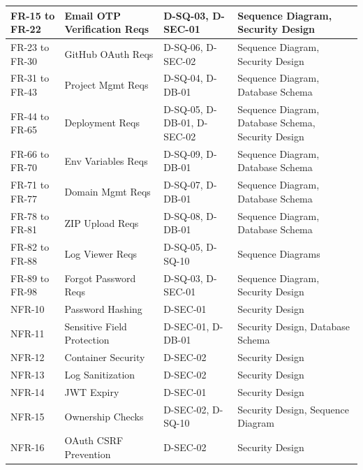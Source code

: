\documentclass[12pt,a4paper]{article}
\begin{document}
{\begin{longtable}{|>{\raggedright\arraybackslash}p{2.2cm}|>{\raggedright\arraybackslash}p{2.5cm}|>{\raggedright\arraybackslash}p{3cm}|>{\raggedright\arraybackslash}p{4cm}|}
\hline
FR-15 to FR-22 & Email OTP Verification Reqs & D-SQ-03, D-SEC-01 & Sequence Diagram, Security Design \\
\hline
FR-23 to FR-30 & GitHub OAuth Reqs & D-SQ-06, D-SEC-02 & Sequence Diagram, Security Design \\
\hline
FR-31 to FR-43 & Project Mgmt Reqs & D-SQ-04, D-DB-01 & Sequence Diagram, Database Schema \\
\hline
FR-44 to FR-65 & Deployment Reqs & D-SQ-05, D-DB-01, D-SEC-02 & Sequence Diagram, Database Schema, Security Design \\
\hline
FR-66 to FR-70 & Env Variables Reqs & D-SQ-09, D-DB-01 & Sequence Diagram, Database Schema \\
\hline
FR-71 to FR-77 & Domain Mgmt Reqs & D-SQ-07, D-DB-01 & Sequence Diagram, Database Schema \\
\hline
FR-78 to FR-81 & ZIP Upload Reqs & D-SQ-08, D-DB-01 & Sequence Diagram, Database Schema \\
\hline
FR-82 to FR-88 & Log Viewer Reqs & D-SQ-05, D-SQ-10 & Sequence Diagrams \\
\hline
FR-89 to FR-98 & Forgot Password Reqs & D-SQ-03, D-SEC-01 & Sequence Diagram, Security Design \\
\hline
NFR-10 & Password Hashing & D-SEC-01 & Security Design \\
\hline
NFR-11 & Sensitive Field Protection & D-SEC-01, D-DB-01 & Security Design, Database Schema \\
\hline
NFR-12 & Container Security & D-SEC-02 & Security Design \\
\hline
NFR-13 & Log Sanitization & D-SEC-02 & Security Design \\
\hline
NFR-14 & JWT Expiry & D-SEC-01 & Security Design \\
\hline
NFR-15 & Ownership Checks & D-SEC-02, D-SQ-10 & Security Design, Sequence Diagram \\
\hline
NFR-16 & OAuth CSRF Prevention & D-SEC-02 & Security Design \\
\hline
\end{longtable}
}

\end{document}
